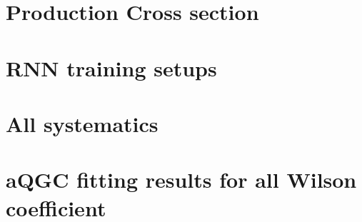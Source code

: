 
%
\clearpage
\section{Production Cross section}
\label{app:Production}


\clearpage
\section{RNN training setups}
\label{app:RNNsetup}


\clearpage
\section{All systematics}
\label{app:allsyst}


%

%
\clearpage
\section{aQGC fitting results for all Wilson coefficient}
\label{app:aQGCresults}

